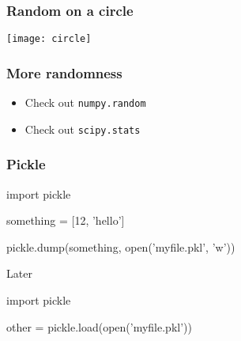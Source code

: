 \begin{frame}[fragile]
\frametitle{Random on a circle}

\centering
\texttt{[image: circle]}

\end{frame}

\begin{frame}[fragile]
\frametitle{More randomness}

\begin{itemize}
\item Check out \lstinline{numpy.random}
\item Check out \lstinline{scipy.stats}
\end{itemize}
\end{frame}

\begin{frame}[fragile]
\frametitle{Pickle}

\begin{python}
import pickle

something = [12, 'hello']

pickle.dump(something, open('myfile.pkl', 'w'))
\end{python}

Later

\begin{python}
import pickle

other = pickle.load(open('myfile.pkl'))
\end{python}
\end{frame}


